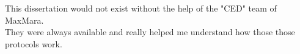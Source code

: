 \thispagestyle{empty}
\null\vfill
\begin{center}
    This dissertation would not exist without the help of the "CED" team of MaxMara.
    \\
    They were always available and really helped me understand how those those protocols
    work.
\end{center}
\vfill\vfill
\clearpage
